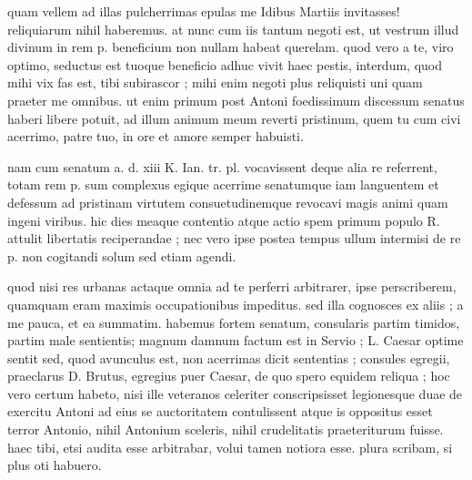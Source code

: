 


 quam vellem ad illas pulcherrimas epulas me Idibus Martiis invitasses! reliquiarum nihil haberemus. at nunc cum iis tantum negoti est, ut vestrum illud divinum in rem p. beneficium non nullam habeat querelam. quod vero a te, viro optimo, seductus est tuoque beneficio adhuc vivit haec pestis, interdum, quod mihi vix fas est, tibi subirascor ; mihi enim negoti plus reliquisti uni quam praeter me omnibus. ut enim primum post Antoni foedissimum discessum senatus haberi libere potuit, ad illum animum meum reverti pristinum, quem tu cum civi acerrimo, patre tuo, in ore et amore semper habuisti.

 nam cum senatum a. d. xiii K. Ian. tr. pl. vocavissent deque alia re referrent, totam rem p. sum complexus egique acerrime senatumque iam languentem et defessum ad pristinam virtutem consuetudinemque revocavi magis animi quam ingeni viribus. hic dies meaque contentio atque actio spem primum populo R. attulit libertatis reciperandae ; nec vero ipse postea tempus ullum intermisi de re p. non cogitandi solum sed etiam agendi.

 quod nisi res urbanas actaque omnia ad te perferri arbitrarer, ipse perscriberem, quamquam eram maximis occupationibus impeditus. sed illa cognosces ex aliis ; a me pauca, et ea summatim. habemus fortem senatum, consularis partim timidos, partim male sentientis; magnum damnum factum est in Servio ; L. Caesar optime sentit sed, quod avunculus est, non acerrimas dicit sententias ; consules egregii, praeclarus D. Brutus, egregius puer Caesar, de quo spero equidem reliqua ; hoc vero certum habeto, nisi ille veteranos celeriter conscripsisset legionesque duae de exercitu Antoni ad eius se auctoritatem contulissent atque is oppositus esset terror Antonio, nihil Antonium sceleris, nihil crudelitatis praeteriturum fuisse. haec tibi, etsi audita esse arbitrabar, volui tamen notiora esse. plura scribam, si plus oti habuero.
